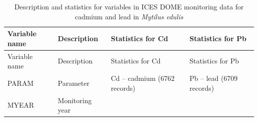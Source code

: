 \documentclass[
  12pt,
]{article}
\begin{document}
\begin{longtable}[]{@{}llll@{}}
\caption{Description and statistics for variables in ICES DOME
monitoring data for cadmium and lead in \emph{Mytilus
edulis}}\tabularnewline
\toprule
\begin{minipage}[b]{0.15\columnwidth}\raggedright
Variable name\strut
\end{minipage} & \begin{minipage}[b]{0.22\columnwidth}\raggedright
Description\strut
\end{minipage} & \begin{minipage}[b]{0.26\columnwidth}\raggedright
Statistics for Cd\strut
\end{minipage} & \begin{minipage}[b]{0.26\columnwidth}\raggedright
Statistics for Pb\strut
\end{minipage}\tabularnewline
\midrule
\endfirsthead
\toprule
\begin{minipage}[b]{0.15\columnwidth}\raggedright
Variable name\strut
\end{minipage} & \begin{minipage}[b]{0.22\columnwidth}\raggedright
Description\strut
\end{minipage} & \begin{minipage}[b]{0.26\columnwidth}\raggedright
Statistics for Cd\strut
\end{minipage} & \begin{minipage}[b]{0.26\columnwidth}\raggedright
Statistics for Pb\strut
\end{minipage}\tabularnewline
\midrule
\endhead
\begin{minipage}[t]{0.15\columnwidth}\raggedright
PARAM\strut
\end{minipage} & \begin{minipage}[t]{0.22\columnwidth}\raggedright
Parameter\strut
\end{minipage} & \begin{minipage}[t]{0.26\columnwidth}\raggedright
Cd -- cadmium (6762 records)\strut
\end{minipage} & \begin{minipage}[t]{0.26\columnwidth}\raggedright
Pb -- lead (6709 records)\strut
\end{minipage}\tabularnewline
\begin{minipage}[t]{0.15\columnwidth}\raggedright
MYEAR\strut
\end{minipage} & \begin{minipage}[t]{0.22\columnwidth}\raggedright
Monitoring year\strut

\end{minipage}
\end{longtable}
\end{document}

